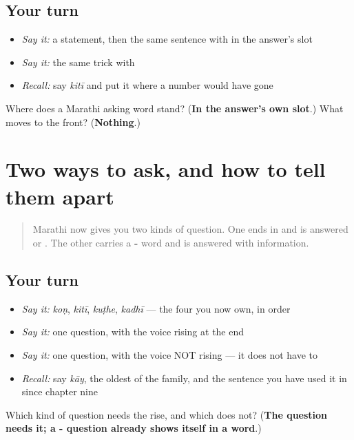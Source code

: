 \subsection*{Your turn}
\begin{itemize}
\raggedright
  \item \emph{Say it:} a statement, then the same sentence with \textbf{} in the answer's slot
  \item \emph{Say it:} the same trick with \textbf{}
  \item \emph{Recall:} say \emph{kitī} and put it where a number would have gone
\end{itemize}

\begin{tcolorbox}[breakable,colback=teal!4,colframe=teal!35!black,title={Before you move on}]
Where does a Marathi asking word stand? (\textbf{In the answer's own slot}.) What moves to the front? (\textbf{Nothing}.)
\end{tcolorbox}
\section[\texorpdfstring{\mr{कुठे}? · \mr{कधी}? (kuṭhe? · kadhī?)}{कुठे? · कधी? (kuṭhe? · kadhī?)}]{Two ways to ask, and how to tell them apart}

\label{lesson:MR-R38-where-when}



\begin{quote}
Marathi now gives you two kinds of question. One ends in \textbf{} and is answered \textbf{} or \textbf{}. The other carries a \textbf{-} word and is answered with information.
\end{quote}

\subsection*{Your turn}
\begin{itemize}
\raggedright
  \item \emph{Say it:} \emph{koṇ}, \emph{kitī}, \emph{kuṭhe}, \emph{kadhī} — the four you now own, in order
  \item \emph{Say it:} one \textbf{} question, with the voice rising at the end
  \item \emph{Say it:} one \textbf{} question, with the voice NOT rising — it does not have to
  \item \emph{Recall:} say \emph{kāy}, the oldest of the family, and the sentence you have used it in since chapter nine
\end{itemize}

\begin{tcolorbox}[breakable,colback=teal!4,colframe=teal!35!black,title={Before you move on}]
Which kind of question needs the rise, and which does not? (\textbf{The  question needs it; a - question already shows itself in a word}.)
\end{tcolorbox}
